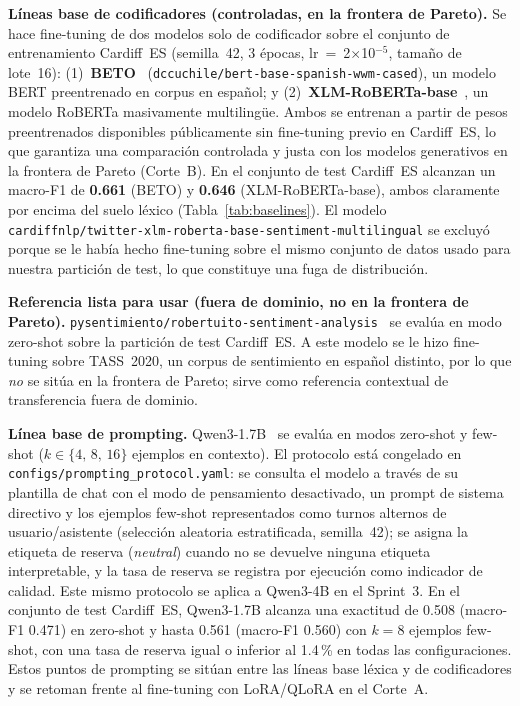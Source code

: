 \documentclass[conference]{IEEEtran}
\begin{document}
\textbf{Líneas base de codificadores (controladas, en la frontera de Pareto).}
Se hace fine-tuning de dos modelos solo de codificador sobre el conjunto de
entrenamiento Cardiff~ES (semilla~42, 3 épocas, lr~=~2$\times$10$^{-5}$, tamaño
de lote~16):
(1)~\textbf{BETO}~\cite{canete2020beto}
(\texttt{dccuchile/\allowbreak bert-base-spanish-wwm-cased}), un modelo BERT preentrenado en
corpus en español; y
(2)~\textbf{XLM-RoBERTa-base}~\cite{conneau2020xlmr}, un modelo RoBERTa
masivamente multilingüe.
Ambos se entrenan a partir de pesos preentrenados disponibles públicamente sin
fine-tuning previo en Cardiff~ES, lo que garantiza una comparación controlada y
justa con los modelos generativos en la frontera de Pareto (Corte~B).
En el conjunto de test Cardiff~ES alcanzan un macro-F1 de \textbf{0.661} (BETO) y
\textbf{0.646} (XLM-RoBERTa-base), ambos claramente por encima del suelo léxico
(Tabla~\ref{tab:baselines}).
El modelo \texttt{cardiffnlp/\allowbreak twitter-\allowbreak xlm-roberta-\allowbreak base-sentiment-\allowbreak multilingual} se
excluyó porque se le había hecho fine-tuning sobre el mismo conjunto de datos
usado para nuestra partición de test, lo que constituye una fuga de distribución.

\textbf{Referencia lista para usar (fuera de dominio, no en la frontera de Pareto).}
\texttt{pysentimiento/\allowbreak robertuito-sentiment-analysis}~\cite{perez2022robertuito}
se evalúa en modo zero-shot sobre la partición de test Cardiff~ES.
A este modelo se le hizo fine-tuning sobre TASS~2020, un corpus de sentimiento en
español distinto, por lo que \emph{no} se sitúa en la frontera de Pareto; sirve
como referencia contextual de transferencia fuera de dominio.

\textbf{Línea base de prompting.}
Qwen3-1.7B~\cite{qwen3technicalreport2025} se evalúa en modos zero-shot y
few-shot ($k \in \{4,\, 8,\, 16\}$ ejemplos en contexto).
El protocolo está congelado en \texttt{configs/prompting\_protocol.yaml}: se
consulta el modelo a través de su plantilla de chat con el modo de pensamiento
desactivado, un prompt de sistema directivo y los ejemplos few-shot
representados como turnos alternos de usuario/asistente (selección aleatoria
estratificada, semilla~42); se asigna la etiqueta de reserva (\textit{neutral})
cuando no se devuelve ninguna etiqueta interpretable, y la tasa de reserva se
registra por ejecución como indicador de calidad.
Este mismo protocolo se aplica a Qwen3-4B en el Sprint~3.
En el conjunto de test Cardiff~ES, Qwen3-1.7B alcanza una exactitud de 0.508
(macro-F1 0.471) en zero-shot y hasta 0.561 (macro-F1 0.560) con $k=8$ ejemplos
few-shot, con una tasa de reserva igual o inferior al 1.4\,\% en todas las
configuraciones.
Estos puntos de prompting se sitúan entre las líneas base léxica y de
codificadores y se retoman frente al fine-tuning con LoRA/QLoRA en el Corte~A.
\end{document}
